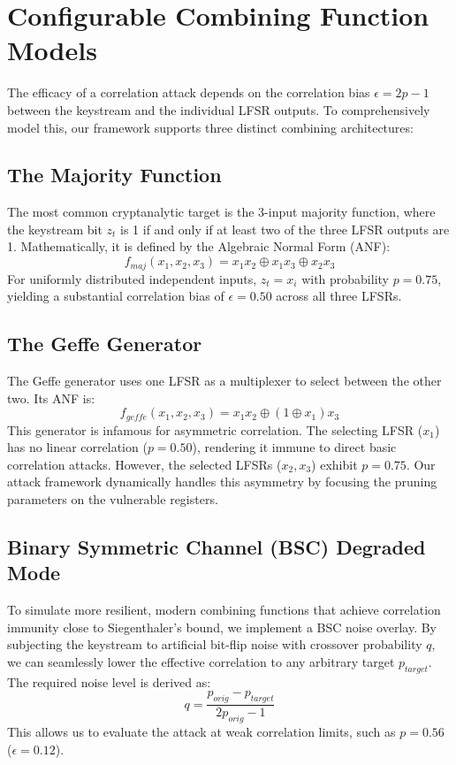 \section{Configurable Combining Function Models}
\label{sec:combining_functions}

The efficacy of a correlation attack depends on the correlation bias $\epsilon = 2p - 1$ between the keystream and the individual LFSR outputs. To comprehensively model this, our framework supports three distinct combining architectures:

\subsection{The Majority Function}
The most common cryptanalytic target is the 3-input majority function, where the keystream bit $z_t$ is 1 if and only if at least two of the three LFSR outputs are 1. Mathematically, it is defined by the Algebraic Normal Form (ANF):
\begin{equation}
    f_{maj}(x_1, x_2, x_3) = x_1 x_2 \oplus x_1 x_3 \oplus x_2 x_3
\end{equation}
For uniformly distributed independent inputs, $z_t = x_i$ with probability $p = 0.75$, yielding a substantial correlation bias of $\epsilon = 0.50$ across all three LFSRs.

\subsection{The Geffe Generator}
The Geffe generator uses one LFSR as a multiplexer to select between the other two. Its ANF is:
\begin{equation}
    f_{geffe}(x_1, x_2, x_3) = x_1 x_2 \oplus (1 \oplus x_1) x_3
\end{equation}
This generator is infamous for asymmetric correlation. The selecting LFSR ($x_1$) has no linear correlation ($p=0.50$), rendering it immune to direct basic correlation attacks. However, the selected LFSRs ($x_2, x_3$) exhibit $p = 0.75$. Our attack framework dynamically handles this asymmetry by focusing the pruning parameters on the vulnerable registers.

\subsection{Binary Symmetric Channel (BSC) Degraded Mode}
To simulate more resilient, modern combining functions that achieve correlation immunity close to Siegenthaler's bound, we implement a BSC noise overlay. By subjecting the keystream to artificial bit-flip noise with crossover probability $q$, we can seamlessly lower the effective correlation to any arbitrary target $p_{target}$. The required noise level is derived as:
\begin{equation}
    q = \frac{p_{orig} - p_{target}}{2 p_{orig} - 1}
\end{equation}
This allows us to evaluate the attack at weak correlation limits, such as $p = 0.56$ ($\epsilon = 0.12$).

